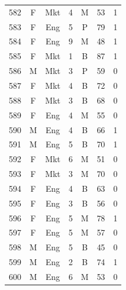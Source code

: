 \documentclass[11pt,a4paper]{article}
\begin{document}
\begin{center}
\begin{tabular}[t]{@{}r c c r c r c@{}}
582 & F & Mkt & 4 & M & 53 & 1 \\
583 & F & Eng & 5 & P & 79 & 1 \\
584 & F & Eng & 9 & M & 48 & 1 \\
585 & F & Mkt & 1 & B & 87 & 1 \\
586 & M & Mkt & 3 & P & 59 & 0 \\
587 & F & Mkt & 4 & B & 72 & 0 \\
588 & F & Mkt & 3 & B & 68 & 0 \\
589 & F & Eng & 4 & M & 55 & 0 \\
590 & M & Eng & 4 & B & 66 & 1 \\
591 & M & Eng & 5 & B & 70 & 1 \\
592 & F & Mkt & 6 & M & 51 & 0 \\
593 & F & Mkt & 3 & M & 70 & 0 \\
594 & F & Eng & 4 & B & 63 & 0 \\
595 & F & Eng & 3 & B & 56 & 0 \\
596 & F & Eng & 5 & M & 78 & 1 \\
597 & F & Eng & 5 & M & 57 & 0 \\
598 & M & Eng & 5 & B & 45 & 0 \\
599 & M & Eng & 2 & B & 74 & 1 \\
600 & M & Eng & 6 & M & 53 & 0 \\
\bottomrule
\end{tabular}
\end{center}
\clearpage
\end{document}
